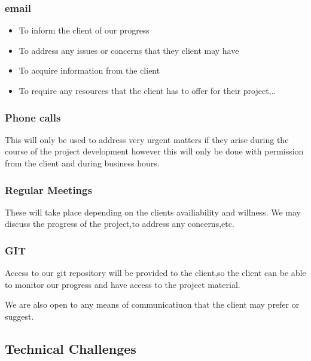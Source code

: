 \documentclass{scrartcl}
\begin{document}
\subsubsection{email}
\begin{itemize}
\item To inform the client of our progress
\item To address any issues or concerns that they client may have
\item To acquire information from the client
\item To require any resources that the client has to offer for their project,..
\end{itemize}

\subsubsection{Phone calls}
 This will only be used to address very urgent matters if they arise during the course of the project development 
 however this will only be done with permission from the client and during business hours.
 
\subsubsection{Regular Meetings}	 
These will take place depending on the clients availiability and willness.
We may discuss the progress of the project,to address any concerns,etc.

\subsubsection{GIT}

Access to our git repository will be provided to the client,so the client can be able to monitor
our progress and have access to the project material.

We are also open to any means of communicatiuon that the client may prefer or suggest.

\subsection{Technical Challenges}
\end{document}
